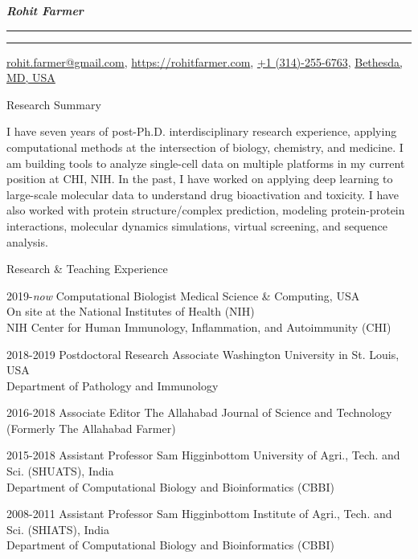 \documentclass[10pt]{article}
\begin{document}
\settowidth{\cvlabelwidth}{%
\cvlabelfont 2009-2009%
}%
\begin{cv}{\huge \it \bfseries Rohit Farmer}
\vskip3pt
\hrule\hrule
\vskip3pt
\hfill \url{rohit.farmer@gmail.com},  \url{https://rohitfarmer.com}, \url{+1 (314)-255-6763}, \url{Bethesda, } \url{MD, USA}

{
\setlength{\cvlabelsep}{0mm}
\setlength{\cvlabelwidth}{0mm}
\begin{cvlist}{Research Summary}
	\item I have seven years of post-Ph.D. interdisciplinary research experience, applying computational methods at the intersection of biology, chemistry, and medicine. I am building tools to analyze single-cell data on multiple platforms in my current position at CHI, NIH. In the past, I have worked on applying deep learning to large-scale molecular data to understand drug bioactivation and toxicity. I have also worked with protein structure/complex prediction, modeling protein-protein interactions, molecular dynamics simulations, virtual screening, and sequence analysis.\end{cvlist}
}

\begin{cvlist}{Research \& Teaching Experience}
        \item[2019-\emph{now}] Computational Biologist \hfill Medical Science \& Computing, USA\\ \hspace*{\fill}On site at the National Institutes of Health (NIH)\\ \hspace*{\fill} NIH Center for Human Immunology, Inflammation, and Autoimmunity (CHI)
	\item[2018-2019] Postdoctoral Research Associate \hfill Washington University in St. Louis, USA\\  \hspace*{\fill} Department of Pathology and Immunology
	\item[2016-2018] Associate Editor \hfill The Allahabad Journal of Science and Technology \\  \hspace*{\fill} (Formerly The Allahabad Farmer)
        \item[2015-2018] Assistant Professor \hfill Sam Higginbottom University of Agri., Tech. and Sci. (SHUATS), India\\  \hspace*{\fill} Department of Computational Biology and Bioinformatics (CBBI)
        \item[2008-2011] Assistant Professor \hfill Sam Higginbottom Institute of Agri., Tech. and Sci. (SHIATS), India\\  \hspace*{\fill} Department of Computational Biology and Bioinformatics (CBBI)
\end{cvlist}


\end{cv}
\end{document}
